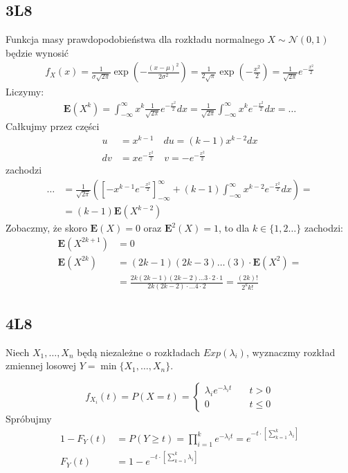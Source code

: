 \documentclass{article}
\begin{document}
\subsection{3L8}

Funkcja masy prawdopodobieństwa dla rozkładu normalnego $X\sim \mathcal{N}(0,1)$ będzie wynosić
\setcounter{equation}{0}
\begin{align}
    f_X(x) = \frac{1}{\sigma \sqrt{2\pi}} \exp\left(-\frac{(x-\mu)^2}{2\sigma^2}\right)
    = \frac{1}{2\sqrt{\pi}} \exp\left(-\frac{x^2}{2}\right) = \frac{1}{\sqrt{2\pi}} e^{-\frac{x^2}{2}}
\end{align}
Liczymy:
\begin{align}
    \mathbf{E}(X^k) = \int_{-\infty}^{\infty} x^k \frac{1}{\sqrt{2\pi}} e^{-\frac{x^2}{2}} dx
    = \frac{1}{\sqrt{2\pi}} \int_{-\infty}^{\infty} x^k e^{-\frac{x^2}{2}} dx = \dots
\end{align}
Całkujmy przez części
\begin{align}
    u &= x^{k-1} \quad  du = (k-1)x^{k-2} dx\\
    dv &= xe^{-\frac{x^2}{2}} \quad v = -e^{-\frac{x^2}{2}}
\end{align}
zachodzi
\begin{align}
    \dots &= \frac{1}{\sqrt{2\pi}} \left(\left[-x^{k-1} e^{-\frac{x^2}{2}} \right]_{-\infty}^{\infty} + (k-1)\int_{-\infty}^{\infty} x^{k-2} e^{-\frac{x^2}{2}} dx\right) =\\
    &= (k-1)\mathbf{E}(X^{k-2})
\end{align}
Zobaczmy, że skoro $\mathbf{E}(X)=0$ oraz $\mathbf{E}^2(X)=1$, to dla $k\in\{1,2\dots\}$ zachodzi:
\begin{align}
    \mathbf{E}(X^{2k+1})&=0\\
    \mathbf{E}(X^{2k})&=(2k-1)(2k-3)\dots(3)\cdot\mathbf{E}(X^2) =\\
    &= \frac{2k(2k-1)(2k-2)\dots 3\cdot 2\cdot 1}{2k(2k-2)\cdot\dots4\cdot2} 
    = \frac{(2k)!}{2^k k!}
\end{align}

\subsection{4L8}

Niech $X_1,\dots,X_n$ będą niezależne o rozkładach $Exp(\lambda_i)$, wyznaczmy rozkład zmiennej losowej 
$Y=\min\{X_1,\dots, X_n\}$.

\[
    f_{X_i}(t) = P(X=t) = \begin{cases}
        \lambda_i e^{-\lambda_i t} \quad &t > 0\\
        0 \quad &t\leq 0
    \end{cases}
\]
Spróbujmy
\setcounter{equation}{0}
\begin{align}
    1-F_{Y}(t) &= P(Y\geq t) = \prod_{i=1}^{k} e^{-\lambda_i t} = e^{-t\cdot \left[\sum_{k=1}^{k} \lambda_i \right]}\\
    F_{Y}(t) &= 1 - e^{-t\cdot \left[\sum_{k=1}^{k} \lambda_i \right]}\\
\end{align}
\end{document}
